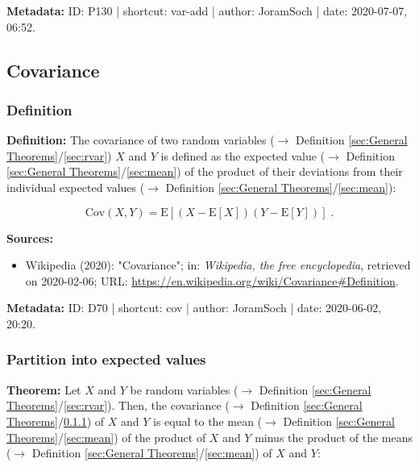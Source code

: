 \documentclass[a4paper,12pt,twoside]{book}
\begin{document}
\vspace{1em}
\textbf{Metadata:} ID: P130 | shortcut: var-add | author: JoramSoch | date: 2020-07-07, 06:52.
\vspace{1em}



\subsection{Covariance}

\subsubsection[\textit{Definition}]{Definition} \label{sec:cov}
\setcounter{equation}{0}

\textbf{Definition:} The covariance of two random variables ($\rightarrow$ Definition \ref{sec:General Theorems}/\ref{sec:rvar}) $X$ and $Y$ is defined as the expected value ($\rightarrow$ Definition \ref{sec:General Theorems}/\ref{sec:mean}) of the product of their deviations from their individual expected values ($\rightarrow$ Definition \ref{sec:General Theorems}/\ref{sec:mean}):

\begin{equation} \label{eq:cov-cov}
\mathrm{Cov}(X,Y) = \mathrm{E}\left[ (X-\mathrm{E}[X]) (Y-\mathrm{E}[Y]) \right] \; .
\end{equation}


\vspace{1em}
\textbf{Sources:}
\begin{itemize}
\item Wikipedia (2020): "Covariance"; in: \textit{Wikipedia, the free encyclopedia}, retrieved on 2020-02-06; URL: \url{https://en.wikipedia.org/wiki/Covariance#Definition}.
\end{itemize}


\vspace{1em}
\textbf{Metadata:} ID: D70 | shortcut: cov | author: JoramSoch | date: 2020-06-02, 20:20.
\vspace{1em}



\subsubsection[\textbf{Partition into expected values}]{Partition into expected values} \label{sec:cov-mean}
\setcounter{equation}{0}

\textbf{Theorem:} Let $X$ and $Y$ be random variables ($\rightarrow$ Definition \ref{sec:General Theorems}/\ref{sec:rvar}). Then, the covariance ($\rightarrow$ Definition \ref{sec:General Theorems}/\ref{sec:cov}) of $X$ and $Y$ is equal to the mean ($\rightarrow$ Definition \ref{sec:General Theorems}/\ref{sec:mean}) of the product of $X$ and $Y$ minus the product of the means ($\rightarrow$ Definition \ref{sec:General Theorems}/\ref{sec:mean}) of $X$ and $Y$:
\end{document}
